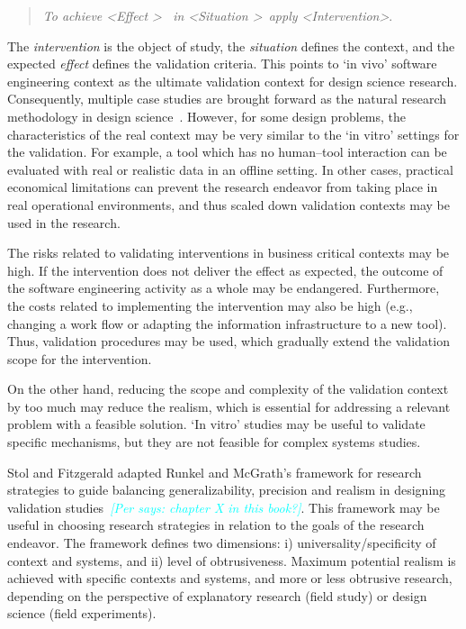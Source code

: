 \documentclass[graybox]{svmult}
\newcommand{\per}[1]{\textcolor{cyan}{{\it [Per says: #1]}}}
\newcommand{\per}[1]{}
\begin{document}
\begin{quote}{\emph{To achieve \textless Effect \textgreater ~ in \textless Situation \textgreater~apply \textless Intervention\textgreater}.} 
\end{quote} 
The \emph{intervention} is the object of study, the \emph{situation} defines the context, and the expected \emph{effect} defines the validation criteria. This points to `in vivo' software engineering context as the ultimate validation context for design science research. Consequently, multiple case studies are brought forward as the natural research methodology in design science~\cite{van_aken_management_2004}. However, for some design problems, the characteristics of the real context may be very similar to the `in vitro' settings for the validation. For example, a tool which has no human--tool interaction can be evaluated with real or realistic data in an offline setting. In other cases, practical economical limitations can prevent the research endeavor from taking place in real operational environments, and thus scaled down validation contexts may be used in the research. 

The risks related to validating interventions in business critical contexts may be high. If the intervention does not deliver the effect as expected, the outcome of the software engineering activity as a whole may be endangered. Furthermore, the costs related to implementing the intervention may also be high (e.g., changing a work flow or adapting the information infrastructure to a new tool). Thus, validation procedures may be used, which gradually extend the validation scope for the intervention.

On the other hand, reducing the scope and complexity of the validation context by too much may reduce the realism, which is essential for addressing a relevant problem with a feasible solution. `In vitro' studies may be useful to validate specific mechanisms, but they are not feasible for complex systems studies.  

Stol and Fitzgerald adapted Runkel and McGrath's framework for research strategies to guide balancing generalizability, precision and realism in designing validation studies~\cite{StolABC18}\per{chapter X in this book?}. This framework may be useful in choosing research strategies in relation to the goals of the research endeavor. The framework defines two dimensions: i) universality/specificity of context and systems, and ii) level of obtrusiveness. Maximum potential realism is achieved with specific contexts and systems, and more or less obtrusive research, depending on the perspective of explanatory research (field study) or design science (field experiments).  
\end{document}
